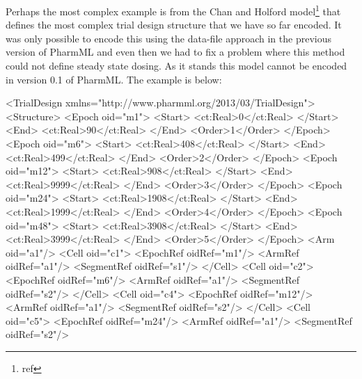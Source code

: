 \documentclass[a4paper,10pt]{article}
\newcommand{\pharmml}{PharmML\xspace}
\begin{document}
Perhaps the most complex example is from the Chan and Holford
model\footnote{ref} that defines the most complex trial design
structure that we have so far encoded. It was only possible to encode
this using the data-file approach in the previous version of \pharmml
and even then we had to fix a problem where this method could not
define steady state dosing. As it stands this model cannot be encoded
in version 0.1 of \pharmml. The example is below:

\begin{xmlcode}
    <TrialDesign xmlns="http://www.pharmml.org/2013/03/TrialDesign">
        <Structure>
            <Epoch oid="m1">
                <Start>
                    <ct:Real>0</ct:Real>
                </Start>
                <End>
                    <ct:Real>90</ct:Real>
                </End>
                <Order>1</Order>
            </Epoch>
            <Epoch oid="m6">
                <Start>
                    <ct:Real>408</ct:Real>
                </Start>
                <End>
                    <ct:Real>499</ct:Real>
                </End>
                <Order>2</Order>
            </Epoch>
            <Epoch oid="m12">
                <Start>
                    <ct:Real>908</ct:Real>
                </Start>
                <End>
                    <ct:Real>9999</ct:Real>
                </End>
                <Order>3</Order>
            </Epoch>
            <Epoch oid="m24">
                <Start>
                    <ct:Real>1908</ct:Real>
                </Start>
                <End>
                    <ct:Real>1999</ct:Real>
                </End>
                <Order>4</Order>
            </Epoch>
            <Epoch oid="m48">
                <Start>
                    <ct:Real>3908</ct:Real>
                </Start>
                <End>
                    <ct:Real>3999</ct:Real>
                </End>
                <Order>5</Order>
            </Epoch>
            <Arm oid="a1"/>
            <Cell oid="c1">
                <EpochRef oidRef="m1"/>
                <ArmRef oidRef="a1"/>
                <SegmentRef oidRef="s1"/>
            </Cell>
            <Cell oid="c2">
                <EpochRef oidRef="m6"/>
                <ArmRef oidRef="a1"/>
                <SegmentRef oidRef="s2"/>
            </Cell>
            <Cell oid="c4">
                <EpochRef oidRef="m12"/>
                <ArmRef oidRef="a1"/>
                <SegmentRef oidRef="s2"/>
            </Cell>
            <Cell oid="c5">
                <EpochRef oidRef="m24"/>
                <ArmRef oidRef="a1"/>
                <SegmentRef oidRef="s2"/>

\end{xmlcode}
\end{document}
